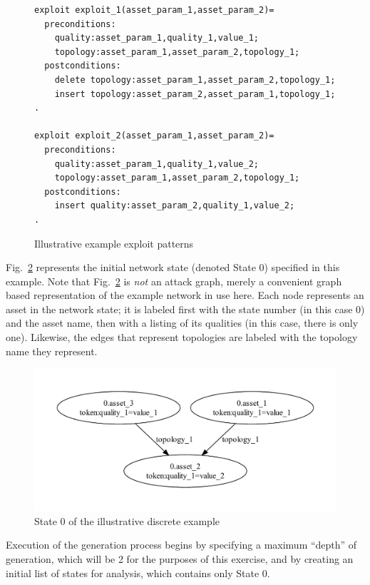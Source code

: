 \begin{figure}
\begin{lstlisting}
exploit exploit_1(asset_param_1,asset_param_2)=
  preconditions:
    quality:asset_param_1,quality_1,value_1;
    topology:asset_param_1,asset_param_2,topology_1;
  postconditions:
    delete topology:asset_param_1,asset_param_2,topology_1;
    insert topology:asset_param_2,asset_param_1,topology_1;
.

exploit exploit_2(asset_param_1,asset_param_2)=
  preconditions:
    quality:asset_param_1,quality_1,value_2;
    topology:asset_param_1,asset_param_2,topology_1;
  postconditions:
    insert quality:asset_param_2,quality_1,value_2;
.
\end{lstlisting}
\caption{Illustrative example exploit patterns}
\label{fig:ill_xp}
\end{figure}

Fig.~\ref{fig:ill_topology_0} represents the initial network state 
(denoted State 0) specified
in this example. Note that Fig.~\ref{fig:ill_topology_0} is \emph{not} an attack
graph, merely a convenient graph based representation of the example network
in use here. Each node represents an asset in the network state; it is labeled
first with the state number (in this case 0) and the asset name, then with a
listing of its qualities (in this case, there is only one).
Likewise, the edges that represent topologies
are labeled with the topology name they represent.

\begin{figure}
\centering
\includegraphics[width=\textwidth]{ag_illustrative_simple/nm_state0}
\caption{State 0 of the illustrative discrete example}
\label{fig:ill_topology_0}
\end{figure}

Execution of the generation process begins by specifying a maximum ``depth''
of generation, which will be 2 for the purposes of this exercise, and by creating
an initial list of states for analysis, which contains only State 0.

